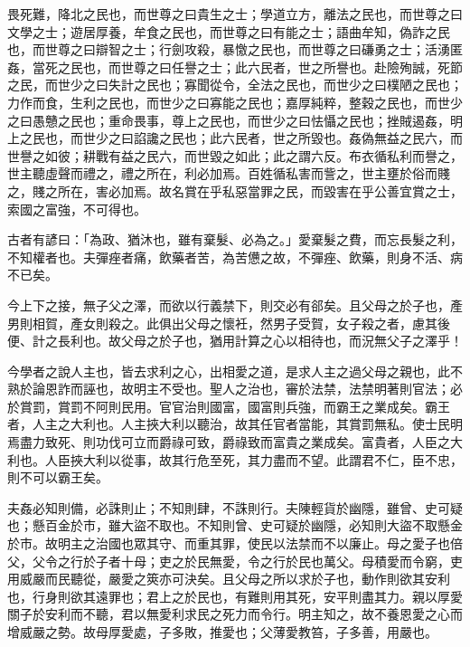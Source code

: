 
\begin{pinyinscope}
畏死難，降北之民也，而世尊之曰貴生之士；學道立方，離法之民也，而世尊之曰文學之士；遊居厚養，牟食之民也，而世尊之曰有能之士；語曲牟知，偽詐之民也，而世尊之曰辯智之士；行劍攻殺，暴憿之民也，而世尊之曰磏勇之士；活湧匿姦，當死之民也，而世尊之曰任譽之士；此六民者，世之所譽也。赴險殉誠，死節之民，而世少之曰失計之民也；寡聞從令，全法之民也，而世少之曰樸陋之民也；力作而食，生利之民也，而世少之曰寡能之民也；嘉厚純粹，整穀之民也，而世少之曰愚戇之民也；重命畏事，尊上之民也，而世少之曰怯懾之民也；挫賊遏姦，明上之民也，而世少之曰諂讒之民也；此六民者，世之所毀也。姦偽無益之民六，而世譽之如彼；耕戰有益之民六，而世毀之如此；此之謂六反。布衣循私利而譽之，世主聽虛聲而禮之，禮之所在，利必加焉。百姓循私害而訾之，世主壅於俗而賤之，賤之所在，害必加焉。故名賞在乎私惡當罪之民，而毀害在乎公善宜賞之士，索國之富強，不可得也。

古者有諺曰：「為政、猶沐也，雖有棄髮、必為之。」愛棄髮之費，而忘長髮之利，不知權者也。夫彈痤者痛，飲藥者苦，為苦憊之故，不彈痤、飲藥，則身不活、病不已矣。

今上下之接，無子父之澤，而欲以行義禁下，則交必有郤矣。且父母之於子也，產男則相賀，產女則殺之。此俱出父母之懷衽，然男子受賀，女子殺之者，慮其後便、計之長利也。故父母之於子也，猶用計算之心以相待也，而況無父子之澤乎！

今學者之說人主也，皆去求利之心，出相愛之道，是求人主之過父母之親也，此不熟於論恩詐而誣也，故明主不受也。聖人之治也，審於法禁，法禁明著則官法；必於賞罰，賞罰不阿則民用。官官治則國富，國富則兵強，而霸王之業成矣。霸王者，人主之大利也。人主挾大利以聽治，故其任官者當能，其賞罰無私。使士民明焉盡力致死、則功伐可立而爵祿可致，爵祿致而富貴之業成矣。富貴者，人臣之大利也。人臣挾大利以從事，故其行危至死，其力盡而不望。此謂君不仁，臣不忠，則不可以霸王矣。

夫姦必知則備，必誅則止；不知則肆，不誅則行。夫陳輕貨於幽隱，雖曾、史可疑也；懸百金於市，雖大盜不取也。不知則曾、史可疑於幽隱，必知則大盜不取懸金於市。故明主之治國也眾其守、而重其罪，使民以法禁而不以廉止。母之愛子也倍父，父令之行於子者十母；吏之於民無愛，令之行於民也萬父。母積愛而令窮，吏用威嚴而民聽從，嚴愛之筴亦可決矣。且父母之所以求於子也，動作則欲其安利也，行身則欲其遠罪也；君上之於民也，有難則用其死，安平則盡其力。親以厚愛關子於安利而不聽，君以無愛利求民之死力而令行。明主知之，故不養恩愛之心而增威嚴之勢。故母厚愛處，子多敗，推愛也；父薄愛教笞，子多善，用嚴也。


\end{pinyinscope}
